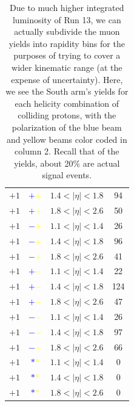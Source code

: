 \begin{table}
\begin{tabular}{cccc}
    $+1$ &\textbf{\textcolor{blue}{$+$}\textcolor{yellow}{$+$}} & $1.4 <\vert\eta\vert< 1.8$ & 94 \\
    $+1$ &\textbf{\textcolor{blue}{$+$}\textcolor{yellow}{$+$}} & $1.8 <\vert\eta\vert< 2.6$ & 50 \\
    $+1$ &\textbf{\textcolor{blue}{$-$}\textcolor{yellow}{$+$}} & $1.1 <\vert\eta\vert< 1.4$ & 26 \\
    $+1$ &\textbf{\textcolor{blue}{$-$}\textcolor{yellow}{$+$}} & $1.4 <\vert\eta\vert< 1.8$ & 96 \\
    $+1$ &\textbf{\textcolor{blue}{$-$}\textcolor{yellow}{$+$}} & $1.8 <\vert\eta\vert< 2.6$ & 41 \\
    $+1$ &\textbf{\textcolor{blue}{$+$}\textcolor{yellow}{$-$}} & $1.1 <\vert\eta\vert< 1.4$ & 22 \\
    $+1$ &\textbf{\textcolor{blue}{$+$}\textcolor{yellow}{$-$}} & $1.4 <\vert\eta\vert< 1.8$ & 124 \\
    $+1$ &\textbf{\textcolor{blue}{$+$}\textcolor{yellow}{$-$}} & $1.8 <\vert\eta\vert< 2.6$ & 47 \\
    $+1$ &\textbf{\textcolor{blue}{$-$}\textcolor{yellow}{$-$}} & $1.1 <\vert\eta\vert< 1.4$ & 26 \\
    $+1$ &\textbf{\textcolor{blue}{$-$}\textcolor{yellow}{$-$}} & $1.4 <\vert\eta\vert< 1.8$ & 97 \\
    $+1$ &\textbf{\textcolor{blue}{$-$}\textcolor{yellow}{$-$}} & $1.8 <\vert\eta\vert< 2.6$ & 66 \\
    $+1$ &\textbf{\textcolor{blue}{$*$}\textcolor{yellow}{$*$}} & $1.1 <\vert\eta\vert< 1.4$ & 0 \\
    $+1$ &\textbf{\textcolor{blue}{$*$}\textcolor{yellow}{$*$}} & $1.4 <\vert\eta\vert< 1.8$ & 0 \\
    $+1$ &\textbf{\textcolor{blue}{$*$}\textcolor{yellow}{$*$}} & $1.8 <\vert\eta\vert< 2.6$ & 0 \\
    \bottomrule
  \end{tabular}
  \caption{
    Due to much higher integrated luminosity of Run 13, we can actually
    subdivide the muon yields into rapidity bins for the purposes of trying to
    cover a wider kinematic range (at the expense of uncertainty). Here, we see
    the South arm's yields for each helicity combination of colliding protons,
    with the polarization of the blue beam and yellow beams color coded in
    column 2. Recall that of the yields, about 20\% are actual signal events.
  }
  \label{tab:south_sorted_muons_eta_bins}
\end{table}

